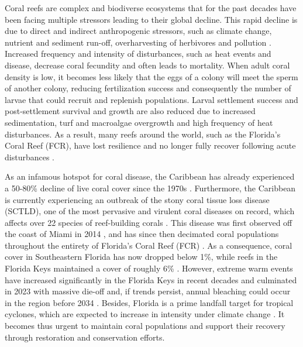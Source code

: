 \documentclass[preprint,12pt,authoryear]{elsarticle}
\begin{document}
Coral reefs are complex and biodiverse ecosystems that for the past decades have been facing multiple stressors leading to their global decline. This rapid decline is due to direct and indirect anthropogenic stressors, such as climate change, nutrient and sediment run-off, overharvesting of herbivores and pollution \citep{hughes2003climate, hughes2018spatial, hoegh2007coral, hoegh2017coral}. Increased frequency and intensity of disturbances, such as heat events and disease, decrease coral fecundity and often leads to mortality. When adult coral density is low, it becomes less likely that the eggs of a colony will meet the sperm of another colony, reducing fertilization success and consequently the number of larvae that could recruit and replenish populations. Larval settlement success and post-settlement survival and growth are also reduced due to increased sedimentation, turf and macroalgae overgrowth and high frequency of heat disturbances. As a result, many reefs around the world, such as the Florida’s Coral Reef (FCR), have lost resilience and no longer fully recover following acute disturbances \citep{jones2022frequent}.

As an infamous hotspot for coral disease, the Caribbean has already experienced a 50-80\% decline of live coral cover since the 1970s \citep{gardner2003long,jackson2014status}. Furthermore, the Caribbean is currently experiencing an outbreak of the stony coral tissue loss disease (SCTLD), one of the most pervasive and virulent coral diseases on record, which affects over 22 species of reef-building corals \citep{noaa2018,meiling2021variable}. This disease was first observed off the coast of Miami in 2014 \citep{precht2016unprecedented}, and has since then decimated coral populations throughout the entirety of Florida's Coral Reef (FCR) \citep{williams2021fine,frrp2021}. As a consequence, coral cover in Southeastern Florida has now dropped below 1\%, while reefs in the Florida Keys maintained a cover of roughly 6\% \citep{grove2022national}. However, extreme warm events have increased significantly in the Florida Keys in recent decades and culminated in 2023 with massive die-off \citep{neely2024too} and, if trends persist, annual bleaching could occur in the region before 2034 \citep{manzello2015rapid}. Besides, Florida is a prime landfall target for tropical cyclones, which are expected to increase in intensity under climate change \citep{dobbelaere2024hurricanes}. It becomes thus urgent to maintain coral populations and support their recovery through restoration and conservation efforts.
\end{document}
